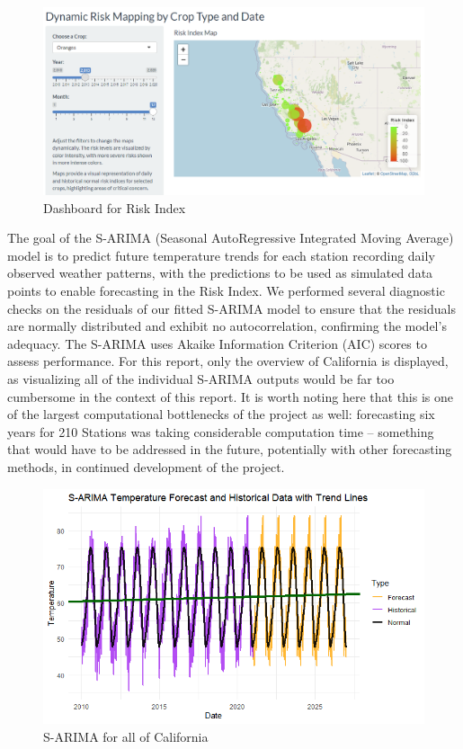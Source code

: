 \documentclass{article}
\begin{document}
\begin{figure}[H]
\vspace*{2mm}
\label{sec:Risk Dashboard}
\centering
\includegraphics[width=.8\textwidth]{Final_Report/images/DynamicRiskIndex_Dashboard.png}
\vspace*{2mm}
\caption{Dashboard for Risk Index}
\end{figure}

The goal of the S-ARIMA (Seasonal AutoRegressive Integrated Moving Average) model is to predict future temperature trends for each station recording daily observed weather patterns, with the predictions to be used as simulated data points to enable forecasting in the Risk Index. We performed several diagnostic checks on the residuals of our fitted S-ARIMA model to ensure that the residuals are normally distributed and exhibit no autocorrelation, confirming the model's adequacy. The S-ARIMA uses Akaike Information Criterion (AIC) scores to assess performance. For this report, only the overview of California is displayed, as visualizing all of the individual S-ARIMA outputs would be far too cumbersome in the context of this report. It is worth noting here that this is one of the largest computational bottlenecks of the project as well: forecasting six years for 210 Stations was taking considerable computation time -- something that would have to be addressed in the future, potentially with other forecasting methods, in continued development of the project.

\begin{figure}[H]
\vspace*{2mm}
\label{sec:ARIMA}
\centering
\includegraphics[width=.8\textwidth]{Final_Report/images/ARIMA_All_CA.png}
\vspace*{2mm}
\caption{S-ARIMA for all of California}
\end{figure}
\end{document}
